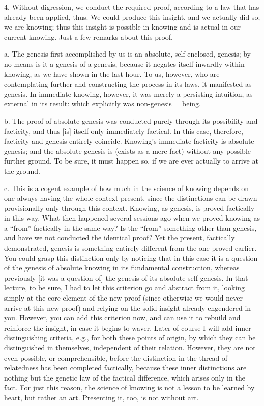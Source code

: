 4. Without digression, we conduct the required proof,
according to a law that has already been applied, thus.
We could produce this insight,
and we actually did so; we are knowing;
thus this insight is possible in knowing
and is actual in our current knowing.
Just a few remarks about this proof.

a. The genesis first accomplished by us is
an absolute, self-enclosed, genesis;
by no means is it a genesis of a genesis,
because it negates itself inwardly within knowing,
as we have shown in the last hour.
To us, however, who are contemplating further
and constructing the process in its laws,
it manifested as genesis.
In immediate knowing, however,
it was merely a persisting intuition,
as external in its result:
which explicitly was non-genesis = being.

b. The proof of absolute genesis was conducted purely
through its possibility and facticity,
and thus [is] itself only immediately factical.
In this case, therefore, facticity and genesis entirely coincide.
Knowing's immediate facticity is absolute genesis;
and the absolute genesis is (exists as a mere fact)
without any possible further ground.
To be sure, it must happen so,
if we are ever actually to arrive at the ground.

c. This is a cogent example of how much
in the science of knowing depends on one
always having the whole context present,
since the distinctions can be drawn
provisionally only through this context.
Knowing, as genesis, is proved factically in this way.
What then happened several sessions ago when
we proved knowing as a “from” factically in the same way?
Is the “from” something other than genesis,
and have we not conducted the identical proof?
Yet the present, factically demonstrated, genesis is
something entirely different from the one proved earlier.
You could grasp this distinction only by
noticing that in this case it is a question of
the genesis of absolute knowing in its fundamental construction,
whereas previously [it was a question of] the
genesis of its absolute self-genesis.
In that lecture, to be sure, I had to let this
criterion go and abstract from it,
looking simply at the core element of the new proof
(since otherwise we would never arrive at this new proof)
and relying on the solid insight already engendered in you.
However, you can add this criterion now,
and can use it to rebuild and reinforce the insight,
in case it begins to waver.
Later of course I will add inner distinguishing criteria,
e.g., for both these points of origin,
by which they can be distinguished in themselves,
independent of their relation.
However, they are not even possible, or comprehensible,
before the distinction in the thread of relatedness
has been completed factically,
because these inner distinctions are nothing but
the genetic law of the factical difference,
which arises only in the fact.
For just this reason, the science of knowing is
not a lesson to be learned by heart,
but rather an art.
Presenting it, too, is not without art.

